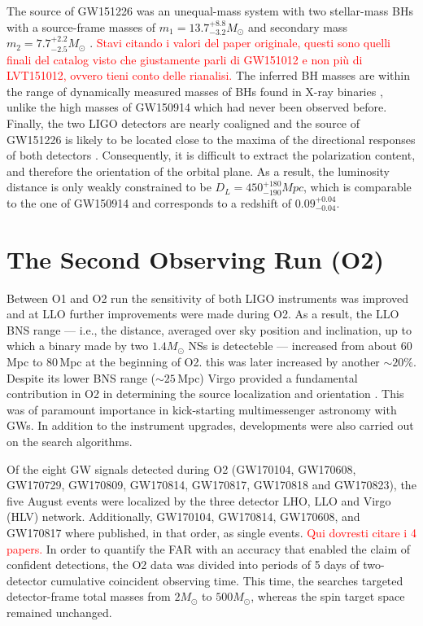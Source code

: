 \documentclass[binding=0.6cm, LaM]{sapthesis}
\newcommand{\fpg}[1]{\textcolor{red}{#1} }
\begin{document}
	The source of GW151226 was an unequal-mass system with two stellar-mass BHs 
	with a source-frame masses of $m_1 = 13.7^{+8.8}_{-3.2}M_\odot$ and secondary mass $m_2 = 7.7^{+2.2}_{-2.5}M_\odot$ \cite{13}. \fpg{Stavi citando i valori del paper originale, questi sono quelli finali del catalog visto che giustamente parli di GW151012 e non pi\`u di LVT151012, ovvero tieni conto delle rianalisi.} 
	The inferred BH masses are within the range of dynamically measured masses of BHs found in X-ray binaries \cite{128-132}, unlike the high masses of GW150914 which had never been observed before. Finally,
        the two LIGO detectors are nearly coaligned and the source of GW151226 is likely to be located close to the maxima of the directional responses of both detectors \cite{28}. 
	Consequently, it is difficult to extract the polarization content, and therefore the orientation of the orbital plane. 
	As a result, the luminosity distance is only weakly constrained to be $D_L = 450^{+180}_{-190}Mpc$, which is comparable to the one of GW150914 and corresponds to a redshift of $0.09^{+0.04}_{-0.04}$.


\section{The Second Observing Run (O2)}

	Between O1 and O2 run the sensitivity of both LIGO instruments was improved and 
	at LLO further improvements were made during O2. 
	As a result, the LLO BNS range --- i.e., the distance, averaged over sky position and inclination, up to which a binary made by two $1.4M_\odot$ NSs is detecteble --- increased from about 60\,Mpc to 80\,Mpc at the beginning of O2.  this was later increased by another $\sim 20\%$.
 	Despite its lower BNS range ($\sim 25\,$Mpc) Virgo provided a fundamental contribution in O2 in determining the source localization and orientation \cite{56}. This was of paramount importance in kick-starting multimessenger astronomy with GWs.
	In addition to the instrument upgrades, developments were also carried out on
	the search algorithms.
 
	Of the eight GW signals detected during O2 (GW170104, GW170608, GW170729, GW170809, GW170814, GW170817, GW170818 and GW170823), the five August events were localized by the three detector LHO, LLO and Virgo (HLV) network.  Additionally, GW170104, GW170814, GW170608, and GW170817 where published, in that order, as single events. \fpg{Qui dovresti citare i 4 papers.}  
	In order to quantify the FAR with an accuracy that enabled the claim of confident detections, the O2 data was divided into periods of 5 days of two-detector cumulative coincident observing time.
	This time, the searches targeted  detector-frame total masses from $2M_\odot$ to $500 M_\odot$, whereas the spin target space remained unchanged.
\end{document}
